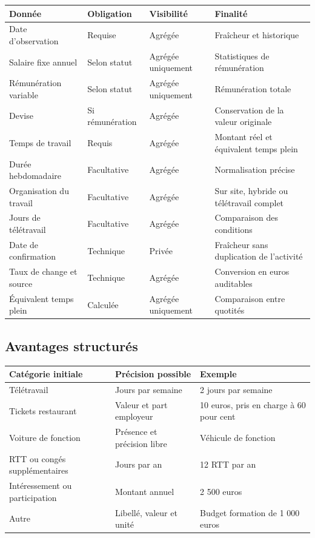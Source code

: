 \documentclass[11pt,a4paper]{article}
\begin{document}
\begin{longtable}{@{}L{43mm}L{30mm}L{28mm}L{65mm}@{}}
  \toprule
  \textbf{Donnée} & \textbf{Obligation} & \textbf{Visibilité} & \textbf{Finalité} \\
  \midrule
  \endhead
  Date d'observation & Requise & Agrégée & Fraîcheur et historique \\
  Salaire fixe annuel & Selon statut & Agrégée uniquement & Statistiques de rémunération \\
  Rémunération variable & Selon statut & Agrégée uniquement & Rémunération totale \\
  Devise & Si rémunération & Agrégée & Conservation de la valeur originale \\
  Temps de travail & Requis & Agrégée & Montant réel et équivalent temps plein \\
  Durée hebdomadaire & Facultative & Agrégée & Normalisation précise \\
  Organisation du travail & Facultative & Agrégée & Sur site, hybride ou télétravail complet \\
  Jours de télétravail & Facultative & Agrégée & Comparaison des conditions \\
  Date de confirmation & Technique & Privée & Fraîcheur sans duplication de l'activité \\
  Taux de change et source & Technique & Agrégée & Conversion en euros auditables \\
  Équivalent temps plein & Calculée & Agrégée uniquement & Comparaison entre quotités \\
  \bottomrule
\end{longtable}

\subsection{Avantages structurés}

\begin{tabularx}{\textwidth}{@{}L{47mm}L{55mm}Y@{}}
  \toprule
  \textbf{Catégorie initiale} & \textbf{Précision possible} & \textbf{Exemple} \\
  \midrule
  Télétravail & Jours par semaine & 2 jours par semaine \\
  Tickets restaurant & Valeur et part employeur & 10 euros, pris en charge à 60 pour cent \\
  Voiture de fonction & Présence et précision libre & Véhicule de fonction \\
  RTT ou congés supplémentaires & Jours par an & 12 RTT par an \\
  Intéressement ou participation & Montant annuel & 2 500 euros \\
  Autre & Libellé, valeur et unité & Budget formation de 1 000 euros \\
  \bottomrule
\end{tabularx}
\end{document}
